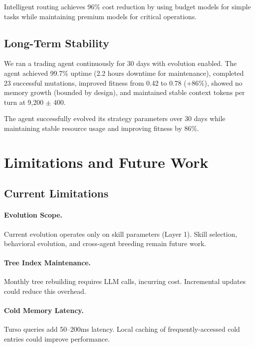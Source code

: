 \documentclass[conference]{IEEEtran}
\begin{document}
Intelligent routing achieves 96\% cost reduction by using budget models for simple tasks while maintaining premium models for critical operations.

\subsection{Long-Term Stability}

We ran a trading agent continuously for 30 days with evolution enabled. The agent achieved 99.7\% uptime (2.2 hours downtime for maintenance), completed 23 successful mutations, improved fitness from 0.42 to 0.78 (+86\%), showed no memory growth (bounded by design), and maintained stable context tokens per turn at 9,200 $\pm$ 400.

The agent successfully evolved its strategy parameters over 30 days while maintaining stable resource usage and improving fitness by 86\%.



\section{Limitations and Future Work}
\label{sec:limitations}

\subsection{Current Limitations}

\paragraph{Evolution Scope.} Current evolution operates only on skill parameters (Layer 1). Skill selection, behavioral evolution, and cross-agent breeding remain future work.

\paragraph{Tree Index Maintenance.} Monthly tree rebuilding requires LLM calls, incurring cost. Incremental updates could reduce this overhead.

\paragraph{Cold Memory Latency.} Turso queries add 50--200ms latency. Local caching of frequently-accessed cold entries could improve performance.
\end{document}
